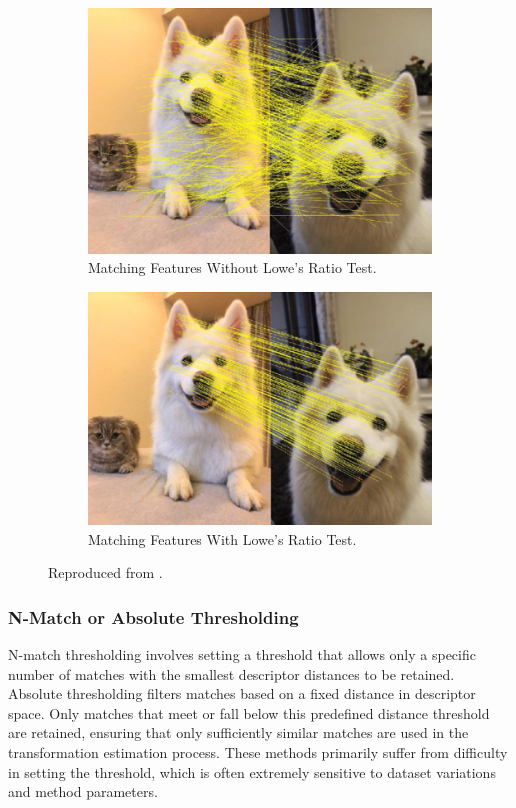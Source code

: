 \begin{figure}[H]
    \centering
    \begin{subfigure}[b]{0.37\textwidth}
        \includegraphics[width=\textwidth]{./Chapter 2/litfigs/lowes1.png}
        \caption{Matching Features Without Lowe's Ratio Test.}
        \label{fig:lowes1}
    \end{subfigure}
    \hfill
    \begin{subfigure}[b]{0.37\textwidth}
        \includegraphics[width=\textwidth]{./Chapter 2/litfigs/lowes2.png}
        \caption{Matching Features With Lowe's Ratio Test.}
        \label{fig:lowes2}
    \end{subfigure}
    \caption{Reproduced from \cite{bian2020gms}.}
    \label{fig:lowes}
\end{figure}


\subsubsection{N-Match or Absolute Thresholding}
N-match thresholding involves setting a threshold that allows only a specific number of matches with the smallest descriptor distances to be retained. Absolute thresholding filters matches based on a fixed distance in descriptor space. Only matches that meet or fall below this predefined distance threshold are retained, ensuring that only sufficiently similar matches are used in the transformation estimation process. These methods primarily suffer from difficulty in setting the threshold, which is often extremely sensitive to dataset variations and method parameters.
